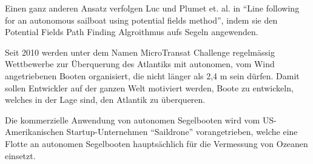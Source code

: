 Einen ganz anderen Ansatz verfolgen Luc und Plumet et. al. in \enquote{Line following for an autonomous sailboat using potential fields method}, indem sie den Potential Fields Path Finding Algroithmus aufs Segeln angewenden. \cite{inproceedings}

Seit 2010 werden unter dem Namen MicroTransat Challenge regelmässig Wettbewerbe zur Überquerung des Atlantiks mit autonomen, vom Wind angetriebenen Booten organisiert, die nicht länger als 2,4 m sein dürfen. 
Damit sollen Entwickler auf der ganzen Welt motiviert werden, Boote zu entwickeln, welches in der Lage sind, den Atlantik zu überqueren. \cite{noauthor_microtransat_nodate}

Die kommerzielle Anwendung von autonomen Segelbooten wird vom US-Amerikanischen 
Startup-Unternehmen \enquote{Saildrone} vorangetrieben, welche eine Flotte an autonomen Segelbooten hauptsächlich für die Vermessung von Ozeanen einsetzt. \cite{noauthor_saildrone_nodate}


























